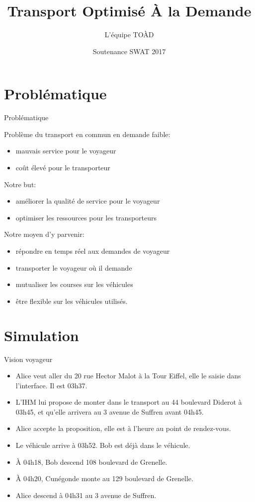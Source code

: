\documentclass[table]{beamer}
\title{Transport Optimisé À la Demande}
\author{L'équipe TOÀD}
\institute[Kisio Digital] %
{
  Kisio Digital\\
  20 rue Hector Malot\\
  75012 Paris, France}
\date{Soutenance SWAT 2017}
\begin{document}
\begin{frame}
  \titlepage
\end{frame}

\section{Problématique}

\begin{frame}{Problématique}

  Problème du transport en commun en demande faible:
  \begin{itemize}
  \item mauvais service pour le voyageur
  \item coût élevé pour le transporteur
  \end{itemize}

  Notre but:
  \begin{itemize}
  \item améliorer la qualité de service pour le voyageur
  \item optimiser les ressources pour les transporteurs
  \end{itemize}

  Notre moyen d'y parvenir:
  \begin{itemize}
  \item répondre en temps réel aux demandes de voyageur
  \item transporter le voyageur où il demande
  \item mutualiser les courses sur les véhicules
  \item être flexible sur les véhicules utilisés.
  \end{itemize}
\end{frame}

\section{Simulation}

\begin{frame}{Vision voyageur}

  \begin{itemize}[<+->]
  \item Alice veut aller du 20 rue Hector Malot à la Tour Eiffel, elle
    le saisie dans l'interface. Il est 03h37.
  \item L'IHM lui propose de monter dans le transport au 44 boulevard
    Diderot à 03h45, et qu'elle arrivera au 3 avenue de Suffren avant
    04h45.
  \item Alice accepte la proposition, elle est à l'heure au point de
    rendez-vous.
  \item Le véhicule arrive à 03h52. Bob est déjà dans le véhicule.
  \item À 04h18, Bob descend 108 boulevard de Grenelle.
  \item À 04h20, Cunégonde monte au 129 boulevard de Grenelle.
  \item Alice descend à 04h31 au 3 avenue de Suffren.
  \end{itemize}
\end{frame}
\end{document}
